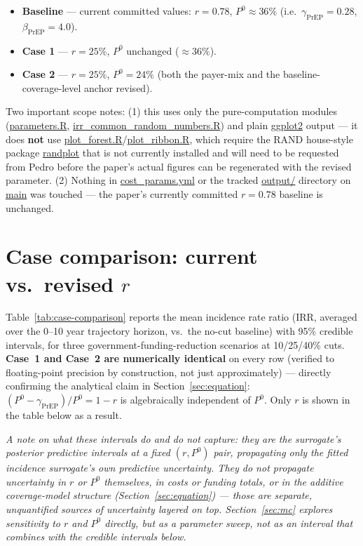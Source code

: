 \documentclass[12pt]{article}
\newcommand{\note}[1]{{\color{noteblue}\textit{#1}}}
\begin{document}
\begin{itemize}
  \item \textbf{Baseline} --- current committed values: $r=0.78$,
    $P^0 \approx 36\%$ (i.e.\ $\gamma_{\text{PrEP}}=0.28$, $\beta_{\text{PrEP}}=4.0$).
  \item \textbf{Case 1} --- $r=25\%$, $P^0$ unchanged ($\approx 36\%$).
  \item \textbf{Case 2} --- $r=25\%$, $P^0=24\%$ (both the payer-mix and the
    baseline-coverage-level anchor revised).
\end{itemize}

Two important scope notes: (1) this uses only the pure-computation modules
(\url{parameters.R}, \url{irr_common_random_numbers.R}) and plain
\url{ggplot2} output --- it does \textbf{not} use
\url{plot_forest.R}/\url{plot_ribbon.R}, which require the RAND
house-style package \url{randplot} that is not currently installed and
will need to be requested from Pedro before the paper's actual figures can
be regenerated with the revised parameter. (2) Nothing in
\url{cost_params.yml} or the tracked \url{output/} directory on
\url{main} was touched --- the paper's currently committed $r=0.78$
baseline is unchanged.

\section{Case comparison: current vs.\ revised $r$}
\label{sec:case-comparison}

Table~\ref{tab:case-comparison} reports the mean incidence rate ratio (IRR,
averaged over the 0--10 year trajectory horizon, vs.\ the no-cut baseline)
with 95\% credible intervals, for three
government-funding-reduction scenarios at 10/25/40\% cuts. \textbf{Case~1
and Case~2 are numerically identical} on every row (verified to
floating-point precision by construction, not just approximately) ---
directly confirming the analytical claim in Section~\ref{sec:equation}:
$(P^0-\gamma_{\text{PrEP}})/P^0 = 1-r$ is algebraically independent of
$P^0$. Only $r$ is shown in the table below as a result.

\note{A note on what these intervals do and do not capture: they are the
surrogate's posterior predictive intervals at a \emph{fixed} $(r, P^0)$
pair, propagating only the fitted incidence surrogate's own predictive
uncertainty. They do not propagate uncertainty in $r$ or $P^0$ themselves,
in costs or funding totals, or in the additive coverage-model structure
(Section~\ref{sec:equation}) --- those are separate, unquantified sources
of uncertainty layered on top. Section~\ref{sec:mc} explores sensitivity to
$r$ and $P^0$ directly, but as a parameter sweep, not as an interval that
combines with the credible intervals below.}
\end{document}
